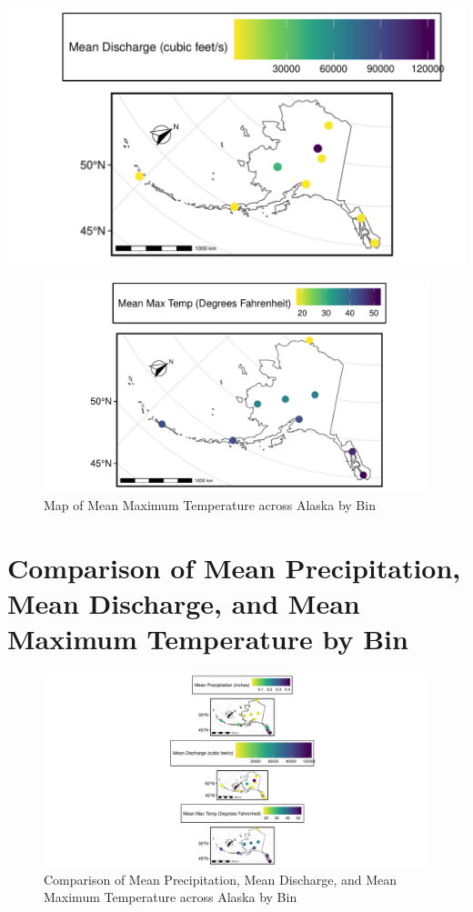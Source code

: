 \documentclass[12pt,]{article}
\begin{document}
\includegraphics{Project_Report_v2_files/figure-latex/unnamed-chunk-6-1.pdf}
\newpage

\begin{figure}
\centering
\includegraphics{Project_Report_v2_files/figure-latex/unnamed-chunk-7-1.pdf}
\caption{Map of Mean Maximum Temperature across Alaska by Bin}
\end{figure}

\hypertarget{comparison-of-mean-precipitation-mean-discharge-and-mean-maximum-temperature-by-bin}{%
\section{Comparison of Mean Precipitation, Mean Discharge, and Mean
Maximum Temperature by
Bin}\label{comparison-of-mean-precipitation-mean-discharge-and-mean-maximum-temperature-by-bin}}

\begin{figure}
\centering
\includegraphics{Project_Report_v2_files/figure-latex/unnamed-chunk-8-1.pdf}
\caption{Comparison of Mean Precipitation, Mean Discharge, and Mean
Maximum Temperature across Alaska by Bin}
\end{figure}
\end{document}
